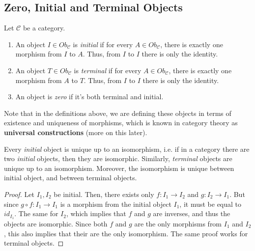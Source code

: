 \subsection{Zero, Initial and Terminal Objects}

\begin{definition}
  Let $\mathcal C$ be a category.
  \begin{enumerate}[1.]
    \item An object $I \in Ob_\mathcal C$ is \textit{initial} if for every $A \in Ob_\mathcal C$,
      there is exactly one morphism from $I$ to $A$. Thus, from $I$ to $I$ there is only the identity.
    \item An object $T \in Ob_\mathcal C$ is \textit{terminal} if for every $A \in Ob_\mathcal C$,
      there is exactly one morphism from $A$ to $T$. Thus, from $I$ to $I$ there is only the identity.
    \item An object is \textit{zero} if it's both terminal and initial.
  \end{enumerate}
\end{definition}

Note that in the definitions above, we are defining these objects in terms of existence and
uniqueness of morphisms, which is known in category theory as \textbf{universal constructions}
(more on this later).

\begin{theorem}
  Every \textit{initial} object is unique up to an isomorphism, i.e. if in a category there 
  are two \textit{initial} objects, then they are isomorphic.
  Similarly, \textit{terminal} objects are unique up to an isomorphism.
  Moreover, the isomorphism is unique between initial object, and between terminal objects.
\end{theorem}
\begin{proof}
  Let $I_1, I_2$ be initial. Then, there exists only $f:I_1 \to I_2$ and $g:I_2 \to I_1$.
  But since $g \circ f:I_1 \to I_1$ is a morphism from the initial object $I_1$, it must
  be equal to $id_{I_1}$. The same for $I_2$, which implies that $f$ and $g$ are inverses,
  and thus the objects are isomorphic. Since both $f$ and $g$ are the only morphisms from
  $I_1$ and $I_2$, this also implies that their are the only isomorphism.
  The same proof works for terminal objects.
\end{proof}


